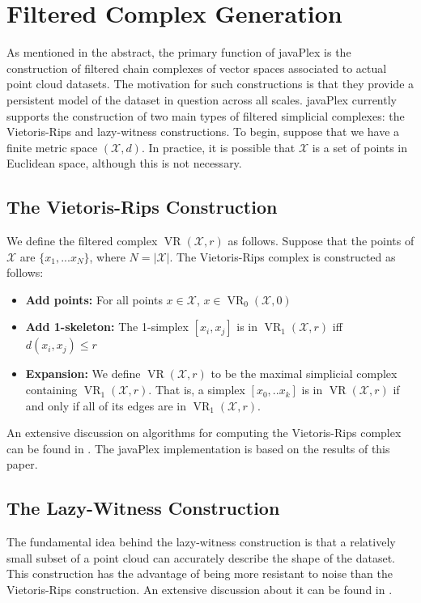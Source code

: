 \section{Filtered Complex Generation}

As mentioned in the abstract, the primary function of javaPlex is the construction of filtered chain complexes of vector spaces associated to actual point cloud datasets. The motivation for such constructions is that they provide a persistent model of the dataset in question across all scales. javaPlex currently supports the construction of two main types of filtered simplicial complexes: the Vietoris-Rips and lazy-witness constructions. To begin, suppose that we have a finite metric space $(\mathcal{X}, d)$. In practice, it is possible that $\mathcal{X}$ is a set of points in Euclidean space, although this is not necessary.

\subsection{The Vietoris-Rips Construction}
We define the filtered complex $\mathop{\mathrm{VR}} (\mathcal{X}, r)$ as follows. Suppose that the points of $\mathcal{X}$ are $\{x_1, ... x_N\}$, where $N = |\mathcal{X}|$. The Vietoris-Rips complex is constructed as follows:

\begin{itemize}
\item {\bf Add points:} For all points $x \in \mathcal{X}$, $x \in \mathop{\mathrm{VR}}_0(\mathcal{X}, 0)$
\item {\bf Add 1-skeleton:} The 1-simplex $[x_i, x_j]$ is in $\mathop{\mathrm{VR}}_1(\mathcal{X}, r)$ iff $d(x_i, x_j) \leq r$
\item {\bf Expansion:} We define $\mathop{\mathrm{VR}} (\mathcal{X}, r)$ to be the maximal simplicial complex containing $\mathop{\mathrm{VR}}_1(\mathcal{X}, r)$. That is, a simplex $[x_0, .. x_k]$ is in $\mathop{\mathrm{VR}} (\mathcal{X}, r)$ if and only if all of its edges are in $\mathop{\mathrm{VR}}_1(\mathcal{X}, r)$.
\end{itemize}

An extensive discussion on algorithms for computing the Vietoris-Rips complex can be found in \cite{Zomorodian}. The javaPlex implementation is based on the results of this paper.

\subsection{The Lazy-Witness Construction}
The fundamental idea behind the lazy-witness construction is that a relatively small subset of a point cloud can accurately describe the shape of the dataset. This construction has the advantage of being more resistant to noise than the Vietoris-Rips construction. An extensive discussion about it can be found in \cite{Witness}. 

